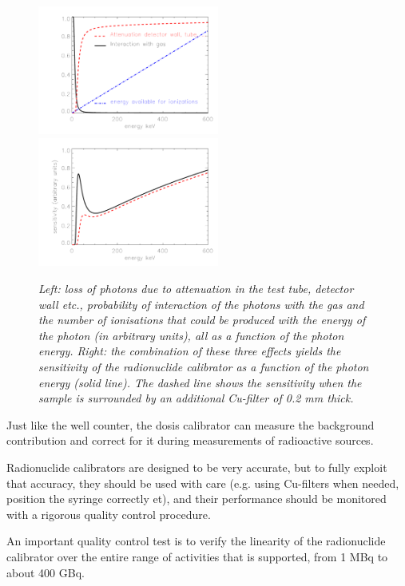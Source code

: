 \documentclass[11pt,oneside]{book}
\begin{document}
\begin{figure}[tb]
\hspace{-4mm}\includegraphics[width=0.53\textwidth]{figs/fig_dosecalib1.pdf}
        \includegraphics[width=0.53\textwidth]{figs/fig_dosecalib2.pdf}
\caption{\label{fig:dosecalib} \emph{Left: loss of photons due to
    attenuation in the test tube, detector wall etc., probability of
    interaction of the photons with the gas and the number of
    ionisations that could be produced with the energy of the photon
    (in arbitrary units), all as a function of the photon
    energy. Right: the combination of these three effects yields the
    sensitivity of the radionuclide calibrator as a function of the photon
    energy (solid line). The dashed line shows the sensitivity when
    the sample is surrounded by an additional Cu-filter of 0.2 mm thick.}}
\end{figure}

Just like the well counter, the dosis calibrator can measure the
background contribution and correct for it during measurements of
radioactive sources.

Radionuclide calibrators are designed to be very accurate, but to fully
exploit that accuracy, they should be used with care (e.g. using
Cu-filters when needed, position the syringe correctly et), and their
performance should be monitored with a rigorous quality control
procedure.

An important quality control test is to verify the linearity of the
radionuclide calibrator over the entire range of activities that is
supported, from 1 MBq to about 400 GBq.
\end{document}
